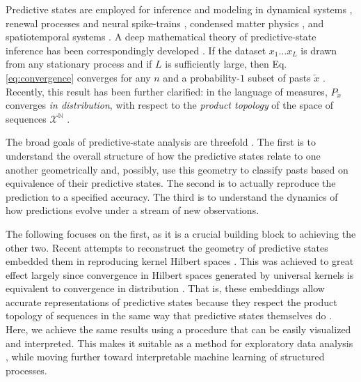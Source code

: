 \documentclass[draft,aps,pre,twocolumn,groupaddress,showkeys,nofootinbib,preprintnumbers,floatfix]{revtex4-2}
\begin{document}
Predictive states are employed for inference and modeling in dynamical systems
\cite{Crut92c}, renewal processes and neural spike-trains
\cite{Marz14e,Marz15a}, condensed matter physics \cite{Varn14a}, and
spatiotemporal systems \cite{Rupe19b}. A deep mathematical
theory of predictive-state inference has been correspondingly developed
\cite{Uppe97a,Jaeg00a,Shal02a,Jame04a,Stil07b,Stre13a,Thon15a,Brod20a}.
If the dataset $x_1 \dots x_L$ is drawn from any stationary process and if $L$
is sufficiently large, then Eq. \eqref{eq:convergence} converges for any $n$
and a probability-$1$ subset of pasts $\overleftarrow{x}$ \cite{Uppe97a}.
Recently, this result has been further clarified: in the language of measures,
$P_{\overleftarrow{x}}$ converges \emph{in distribution}, with respect to the
\emph{product topology} of the space of sequences $\mathcal{X}^\mathbb{N}$
\cite{Loom21a}.

The broad goals of predictive-state analysis are threefold \cite{Shal98a}. The
first is to understand the overall structure of how the predictive states
relate to one another geometrically and, possibly, use this geometry to
classify pasts based on equivalence of their predictive states. The second is
to actually reproduce the prediction to a specified accuracy. The third is to
understand the dynamics of how predictions evolve under a stream of new
observations. 

The following focuses on the first, as it is a crucial building block to
achieving the other two. Recent attempts to reconstruct the geometry of
predictive states embedded them in reproducing kernel Hilbert spaces
\cite{Song09a,Song10a,Boot13a,Brod20a,Loom21a}. This was achieved to great
effect largely since convergence in Hilbert spaces generated by universal
kernels is equivalent to convergence in distribution \cite{Srip10a}. That is,
these embeddings allow accurate representations of predictive states because
they respect the product topology of sequences in the same way that predictive
states themselves do \cite{Loom21a}. Here, we achieve the same results using a
procedure that can be easily visualized and interpreted. This makes it suitable
as a method for exploratory data analysis \cite{Tuke62a,Tuke77a}, while moving
further toward interpretable machine learning of structured processes.
\end{document}
